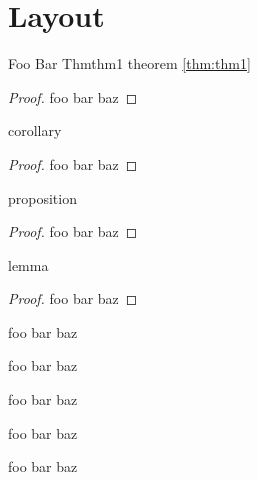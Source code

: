 
\chapter{Layout}

\begin{theorem}{Foo Bar Thm}{thm1}
theorem
\ref{thm:thm1}
\end{theorem}

\begin{proof}
foo bar baz
\end{proof}

\begin{corollary}{}{}
corollary
\end{corollary}

\begin{proof}
foo bar baz
\end{proof}


\begin{proposition}{}{}
proposition
\end{proposition}

\begin{proof}
foo bar baz
\end{proof}


\begin{lemma}{}{}
lemma
\end{lemma}

\begin{proof}
foo bar baz
\end{proof}


\begin{fact}{}{}
foo bar baz
\end{fact}

\begin{notation}{}{}
foo bar baz
\end{notation}

\begin{definition}{}{}
foo bar baz
\end{definition}

\begin{example}{}{}
foo bar baz
\end{example}

\begin{myremark}{}{}
foo bar baz
\end{myremark}
